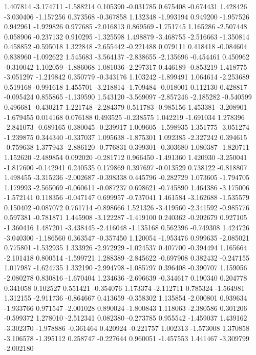 1.407814
-3.174711
-1.588214
0.105390
-0.031785
0.675408
-0.674431
1.428426
-3.030406
-1.157256
0.373568
-0.367858
1.132348
-1.993194
0.949200
-1.957526
0.942961
-1.929826
0.977685
-2.016813
0.869569
-1.751745
1.165286
-2.507448
0.058906
-0.237132
0.910295
-1.325598
1.498879
-3.468755
-2.516663
-1.350814
0.458852
-0.595018
1.322848
-2.655442
-0.221488
0.079111
0.418418
-0.084604
0.838960
-1.092622
1.545683
-3.564137
-2.838655
-2.135696
-0.454461
0.450962
-0.310042
1.102059
-1.886068
1.081036
-2.297317
0.446189
-0.853219
1.418775
-3.051297
-1.219842
0.350779
-0.343176
1.103242
-1.899491
1.064614
-2.253689
0.519168
-0.991618
1.455701
-3.218814
-1.709484
-0.018001
0.112130
0.428817
-0.095424
0.855865
-1.139590
1.543120
-3.569097
-2.857246
-2.185282
-0.540599
0.496681
-0.430217
1.221748
-2.284379
0.511783
-0.985156
1.453381
-3.208901
-1.679455
0.014168
0.076188
0.493525
-0.238575
1.042219
-1.691034
1.278396
-2.841073
-0.689165
0.380045
-0.239917
1.009605
-1.598935
1.351775
-3.051274
-1.239875
0.344340
-0.337037
1.095638
-1.875301
1.092385
-2.327242
0.394615
-0.759638
1.377943
-2.886120
-0.776831
0.399301
-0.303680
1.080387
-1.820711
1.152620
-2.489854
0.092020
-0.281712
0.966450
-1.491360
1.420930
-3.250041
-1.817600
-0.142941
0.240535
0.179869
0.397697
-0.013529
0.738122
-0.818807
1.498455
-3.315236
-2.002687
-0.398338
0.445796
-0.282729
1.073605
-1.794705
1.179993
-2.565069
-0.060611
-0.087237
0.698621
-0.745890
1.464386
-3.175006
-1.572141
0.118356
-0.047147
0.699957
-0.737041
1.461584
-3.162688
-1.535579
0.150402
-0.087072
0.761714
-0.898666
1.521326
-3.419560
-2.341592
-0.985776
0.597381
-0.781871
1.445908
-3.122287
-1.419100
0.240362
-0.202679
0.927105
-1.360416
1.487201
-3.438445
-2.416048
-1.135168
0.562396
-0.749308
1.424726
-3.040300
-1.186560
0.363547
-0.357450
1.120054
-1.953476
0.999635
-2.085021
0.775801
-1.532935
1.333926
-2.972929
-1.024537
0.407700
-0.394494
1.165664
-2.101418
0.800514
-1.599721
1.288389
-2.845622
-0.697908
0.382432
-0.247155
1.017987
-1.624735
1.332190
-2.994798
-1.085797
0.396408
-0.390707
1.159056
-2.080278
0.830816
-1.670404
1.234636
-2.696639
-0.344617
0.190340
0.204778
0.341058
0.102527
0.551421
-0.354076
1.173374
-2.112711
0.785324
-1.564981
1.312155
-2.911736
-0.864667
0.413659
-0.358302
1.135854
-2.000801
0.939634
-1.933766
0.971547
-2.001028
0.890024
-1.800843
1.118063
-2.380586
0.301206
-0.599372
1.278010
-2.512341
0.082380
-0.273785
0.955542
-1.459037
1.439162
-3.302370
-1.978886
-0.361464
0.420924
-0.221757
1.002313
-1.573008
1.370858
-3.106578
-1.395112
0.258747
-0.227644
0.960051
-1.457553
1.441467
-3.309799
-2.002180
